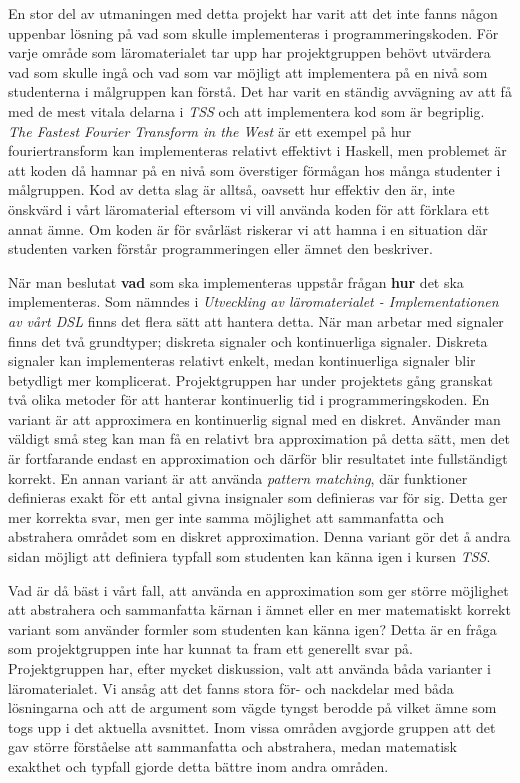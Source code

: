\documentclass[]{article}
\begin{document}
En stor del av utmaningen med detta projekt har varit att det inte fanns någon uppenbar lösning på vad som skulle 
implementeras i programmeringskoden. För varje område som läromaterialet tar upp har projektgruppen behövt utvärdera 
vad som skulle ingå och vad som var möjligt att implementera på en nivå som studenterna i målgruppen kan förstå. Det 
har varit en ständig avvägning av att få med de mest vitala delarna i \textit{TSS} och att implementera kod som är 
begriplig.  \textit{The Fastest Fourier Transform in the West} %
är ett exempel på hur fouriertransform kan implementeras relativt effektivt i Haskell, men problemet är att koden då 
hamnar på en nivå som överstiger förmågan hos många studenter i målgruppen. Kod av detta slag är alltså, oavsett hur 
effektiv den är, inte önskvärd i vårt läromaterial eftersom vi vill använda koden för att förklara ett annat ämne. Om 
koden är för svårläst riskerar vi att hamna i en situation där studenten varken förstår programmeringen eller ämnet den 
beskriver.

När man beslutat \textbf{vad} som ska implementeras uppstår frågan \textbf{hur} det ska implementeras. Som nämndes i 
\textit{Utveckling av läromaterialet - Implementationen av vårt DSL} finns det flera sätt att hantera detta. När man 
arbetar med signaler finns det två grundtyper; diskreta signaler och kontinuerliga signaler. Diskreta signaler kan 
implementeras relativt enkelt, medan kontinuerliga signaler blir betydligt mer komplicerat. Projektgruppen har under 
projektets gång granskat två olika metoder för att hanterar kontinuerlig tid i programmeringskoden. En variant är att 
approximera en kontinuerlig signal med en diskret. Använder man väldigt små steg kan man få en relativt bra 
approximation på detta sätt, men det är fortfarande endast en approximation och därför blir resultatet inte 
fullständigt korrekt. En annan variant är att använda \textit{pattern matching}, där funktioner definieras exakt för 
ett antal givna insignaler som definieras var för sig. Detta ger mer korrekta svar, men ger inte samma möjlighet att 
sammanfatta och abstrahera området som en diskret approximation. Denna variant gör det å andra sidan möjligt att 
definiera typfall som studenten kan känna igen i kursen \textit{TSS}.

Vad är då bäst i vårt fall, att använda en approximation som ger större möjlighet att abstrahera och sammanfatta kärnan 
i ämnet eller en mer matematiskt korrekt variant som använder formler som studenten kan känna igen? Detta är en fråga 
som projektgruppen inte har kunnat ta fram ett generellt svar på. Projektgruppen har, efter mycket diskussion, valt att 
använda båda varianter i läromaterialet. Vi ansåg att det fanns stora för- och nackdelar med båda lösningarna och att 
de argument som vägde tyngst berodde på vilket ämne som togs upp i det aktuella avsnittet. Inom vissa områden avgjorde 
gruppen att det gav större förståelse att sammanfatta och abstrahera, medan matematisk exakthet och typfall gjorde 
detta bättre inom andra områden.
\end{document}
